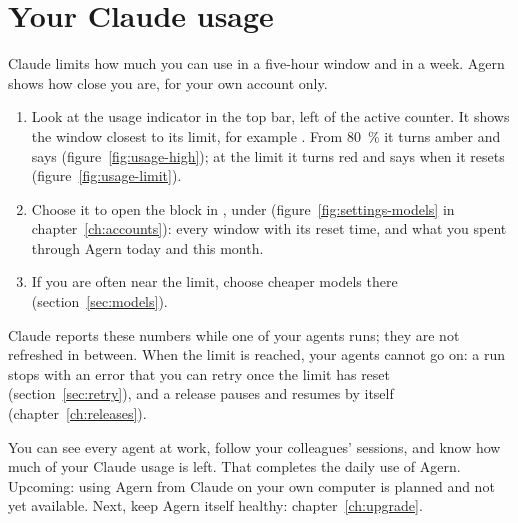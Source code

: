 
\section{Your Claude usage}\label{sec:usage}

Claude limits how much you can use in a five-hour window and in a week. Agern shows how close you
are, for your own account only.

\begin{enumerate}
  \item Look at the usage indicator in the top bar, left of the active counter. It shows the window
    closest to its limit, for example . From 80~\% it turns amber and says 
    (figure~\ref{fig:usage-high}); at the limit it turns red and says when it resets
    (figure~\ref{fig:usage-limit}).
  \item Choose it to open the  block in , under 
    (figure~\ref{fig:settings-models} in chapter~\ref{ch:accounts}): every window with its reset time,
    and what you spent through Agern today and this month.
  \item If you are often near the limit, choose cheaper models there (section~\ref{sec:models}).
\end{enumerate}

Claude reports these numbers while one of your agents runs; they are not refreshed in between.
When the limit is reached, your agents cannot go on: a run stops with an error that you can retry
once the limit has reset (section~\ref{sec:retry}), and a release pauses and resumes by itself
(chapter~\ref{ch:releases}).



\whatyouhave
You can see every agent at work, follow your colleagues' sessions, and know how much of your
Claude usage is left. That completes the daily use of Agern.
Upcoming: using Agern from Claude on your own computer is planned and not yet available.
Next, keep Agern itself healthy: chapter~\ref{ch:upgrade}.
